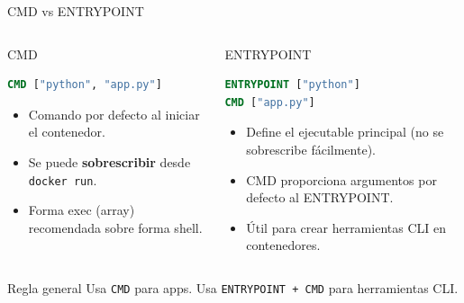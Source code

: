 \documentclass[aspectratio=169]{beamer}
\begin{document}
\begin{frame}[fragile]{CMD vs ENTRYPOINT}
  \footnotesize
  \begin{columns}[T]
    \begin{block}{CMD}
\begin{lstlisting}[language=Dockerfile]
CMD ["python", "app.py"]
\end{lstlisting}
      \begin{itemize}
        \item Comando por defecto al iniciar el contenedor.
        \item Se puede \textbf{sobrescribir} desde \texttt{docker run}.
        \item Forma exec (array) recomendada sobre forma shell.
      \end{itemize}
    \end{block}
    \begin{block}{ENTRYPOINT}
\begin{lstlisting}[language=Dockerfile]
ENTRYPOINT ["python"]
CMD ["app.py"]
\end{lstlisting}
      \begin{itemize}
        \item Define el ejecutable principal (no se sobrescribe fácilmente).
        \item CMD proporciona argumentos por defecto al ENTRYPOINT.
        \item Útil para crear herramientas CLI en contenedores.
      \end{itemize}
    \end{block}
  \end{columns}
  \vspace{-0.05cm}
  \begin{exampleblock}{Regla general}
    Usa \texttt{CMD} para apps. Usa \texttt{ENTRYPOINT + CMD} para herramientas CLI.
  \end{exampleblock}
\end{frame}
\end{document}
